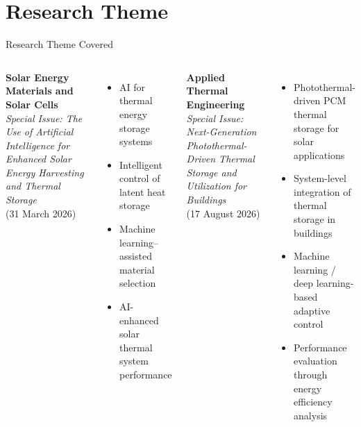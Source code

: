 \section{Research Theme}
\begin{frame}{Research Theme Covered}

\begin{columns}[T] %

\textbf{Solar Energy Materials and Solar Cells}\\
\textit{Special Issue: The Use of Artificial Intelligence for Enhanced Solar Energy Harvesting and Thermal Storage}
\cite{SpecialIssueAI2026}\\
{\footnotesize (31 March 2026)}

\vspace{0.2cm}
\begin{itemize}
    \item AI for thermal energy storage systems
    \item Intelligent control of latent heat storage
    \item Machine learning--assisted material selection
    \item AI-enhanced solar thermal system performance
\end{itemize}

\textbf{Applied Thermal Engineering}\\
\textit{Special Issue: Next-Generation Photothermal-Driven Thermal Storage and Utilization for Buildings}
\cite{SpecialIssueATE2026}\\
{\footnotesize (17 August 2026)}

\vspace{0.2cm}
\begin{itemize}
    \item Photothermal-driven PCM thermal storage for solar applications
    \item System-level integration of thermal storage in buildings
    \item Machine learning / deep learning-based adaptive control
    \item Performance evaluation through energy efficiency analysis
\end{itemize}

\end{columns}

\end{frame}